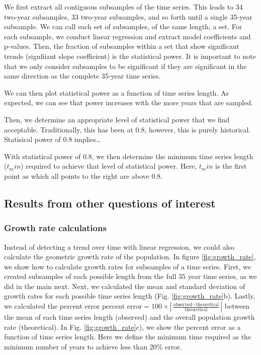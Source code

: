 \documentclass[12pt,]{article}
\begin{document}
We first extract all contiguous subsamples of the time series. This
leads to 34 two-year subsamples, 33 two-year subsamples, and so forth
until a single 35-year subsample. We can call each set of subsamples, of
the same length, a set. For each subsample, we conduct linear regression
and extract model coefficients and p-values. Then, the fraction of
subsamples within a set that show significant trends (signfiiant slope
coefficient) is the statistical power. It is important to note that we
only consider subsamples to be significant if they are significant in
the same direction as the complete 35-year time series.

We can then plot statistical power as a function of time series length.
As expected, we can see that power increases with the more years that
are sampled.

Then, we determine an appropriate level of statistical power that we
find acceptable. Traditionally, this has been at 0.8, however, this is
purely historical. Statisical power of 0.8 implies\ldots{}

With statistical power of 0.8, we then determine the minimum time series
length (\(t_min\)) required to achieve that level of statistical power.
Here, \(t_min\) is the first point as which all points to the right are
above 0.8.

\subsection{Results from other questions of
interest}\label{results-from-other-questions-of-interest}

\subsubsection{Growth rate calculations}\label{growth-rate-calculations}

Instead of detecting a trend over time with linear regression, we could
also calculate the geometric growth rate of the population. In figure
\ref{fig:growth_rate}, we show how to calculate growth rates for
subsamples of a time series. First, we created subsamples of each
possible length from the full 35 year time series, as we did in the main
next. Next, we calculated the mean and standard deviation of growth
rates for each possible time series length (Fig.
\ref{fig:growth_rate}b). Lastly, we calculated the percent error
\(\mbox{percent error} = 100 \times \left| \frac{\mbox{observed} - \mbox{theoretical}}{\mbox{theoretical}} \right|\)
between the mean of each time series length (observed) and the overall
population growth rate (theoretical). In Fig. \ref{fig:growth_rate}c),
we show the percent error as a function of time series length. Here we
define the minimum time required as the minimum number of years to
achieve less than 20\% error.
\end{document}
